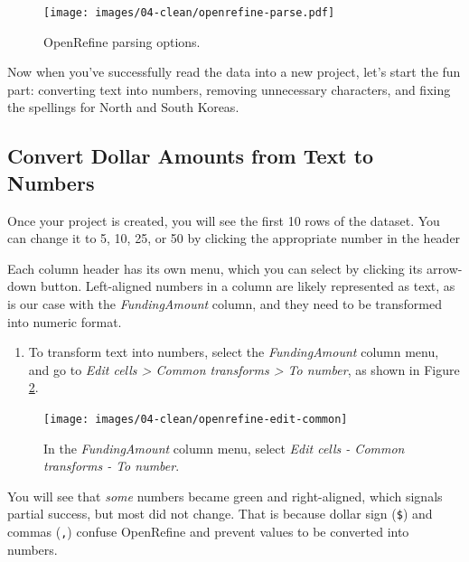 \documentclass[
  english,
]{book}
\providecommand{\tightlist}{%
  \setlength{\itemsep}{0pt}\setlength{\parskip}{0pt}}
\begin{document}
\begin{figure}
\centering
\texttt{[image: images/04-clean/openrefine-parse.pdf]}
\caption{\label{fig:openrefine-parse}OpenRefine parsing options.}
\end{figure}

Now when you've successfully read the data into a new project, let's start
the fun part: converting text into numbers, removing unnecessary characters,
and fixing the spellings for North and South Koreas.

\hypertarget{convert-dollar-amounts-from-text-to-numbers}{%
\subsection*{Convert Dollar Amounts from Text to Numbers}\label{convert-dollar-amounts-from-text-to-numbers}}

Once your project is created, you will see the first 10 rows of the dataset.
You can change it to 5, 10, 25, or 50 by clicking the appropriate number in the header

Each column header has its own menu, which you can select by clicking its arrow-down button.
Left-aligned numbers in a column are likely represented as text, as is our case with the \emph{FundingAmount} column, and they need to be transformed into numeric format.

\begin{enumerate}
\def\labelenumi{\arabic{enumi}.}
\tightlist
\item
  To transform text into numbers, select the \emph{FundingAmount} column menu, and go to \emph{Edit cells \textgreater{} Common transforms \textgreater{} To number}, as shown in Figure \ref{fig:openrefine-edit-common}.
\end{enumerate}



\begin{figure}
\texttt{[image: images/04-clean/openrefine-edit-common]} \caption{In the \emph{FundingAmount} column menu, select \emph{Edit cells - Common transforms - To number}.}\label{fig:openrefine-edit-common}
\end{figure}

You will see that \emph{some} numbers became green and right-aligned, which signals partial success, but most did not change. That is because dollar sign (\texttt{\$}) and commas (\texttt{,}) confuse OpenRefine and prevent values to be converted into numbers.
\end{document}
